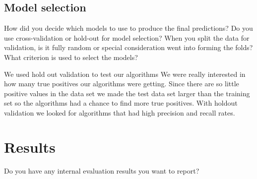 \documentclass[11pt,a4paper]{article}
\begin{document}
	\subsection{Model selection}
		How did you decide which models to use to produce the final predictions?  Do you use cross-validation or hold-out for model selection? When you split the data for validation, is it fully 		random or special consideration went into forming the folds? What criterion is used to select the models?

		We used hold out validation to test our algorithms
		We were really interested in how many true positives our algorithms were getting.
		Since there are so little positive values in the data set we made the test data set larger than the training set so the algorithms had a chance to find more true positives.
		With holdout validation we looked for algorithms that had high precision and recall rates.

\section{Results}
	Do you have any internal evaluation results you want to report?
\end{document}
